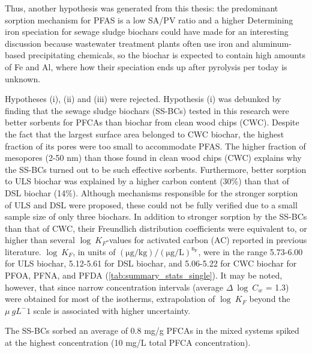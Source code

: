 Thus, another hypothesis was generated from this thesis: the predominant sorption mechanism for PFAS is a low SA/PV ratio and a higher  
Determining iron speciation for sewage sludge biochars could have made for an interesting discussion because wastewater treatment plants often use iron and aluminum-based precipitating chemicals, so the biochar is expected to contain high amounts of Fe and Al, where how their speciation ends up after pyrolysis per today is unknown.

Hypotheses (i), (ii) and (iii) were rejected. Hypothesis (i) was debunked by finding that the sewage sludge biochars (SS-BCs) tested in this research were better sorbents for PFCAs than biochar from clean wood chips (CWC). Despite the fact that the largest surface area belonged to CWC biochar, the highest fraction of its pores were too small to accommodate PFAS. The higher fraction of mesopores (2-50 nm) than those found in clean wood chips (CWC) explains why the SS-BCs turned out to be such effective sorbents. Furthermore, better sorption to ULS biochar was explained by a higher carbon content (30\%) than that of DSL biochar (14\%). Although mechanisms responsible for the stronger sorption of ULS and DSL were proposed, these could not be fully verified due to a small sample size of only three biochars. In addition to stronger sorption by the SS-BCs than that of CWC, their Freundlich distribution coefficients were equivalent to, or higher than several $\log~K_F$-values for activated carbon (AC) reported in previous literature. $\log~K_F$, in units of $\mathrm{(\mu g/kg)/(\mu g/L)^{n_F}}$, were in the range 5.73-6.00 for ULS biochar, 5.12-5.61 for DSL biochar, and 5.06-5.22 for CWC biochar for PFOA, PFNA, and PFDA (\cref{tab:summary_stats_single}). It may be noted, however, that since narrow concentration intervals (average $\Delta~\log~C_w$ = 1.3) were obtained for most of the isotherms, extrapolation of $\log~K_F$ beyond the $\mu~g L^-1$ scale is associated with higher uncertainty.




The SS-BCs sorbed an average of 0.8 mg/g PFCAs in the mixed systems spiked at the highest concentration (10 mg/L total PFCA concentration).

